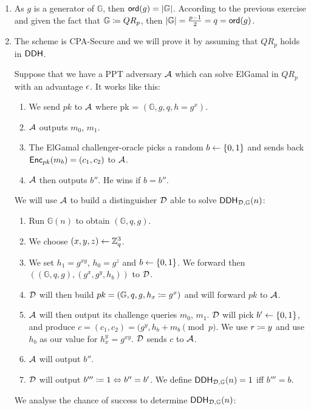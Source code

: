 \begin{solution}
	\begin{enumerate}
		\item As $g$ is a generator of $\mathbb{G}$, then $\operatorname{\mathsf{ord}}(g)=|\mathbb{G}|$.
		According to the previous exercise and given the fact that $\mathbb{G} \coloneqq QR_p$, then $|\mathbb{G}| = \frac{p - 1}{2} = q =  \operatorname{\mathsf{ord}}(g)$.

		\item The scheme is CPA-Secure and we will prove it by assuming that $QR_p$ holds in $\mathsf{DDH}$.

		Suppose that we have a PPT adversary $\mathcal{A}$ which can solve ElGamal in $QR_p$ with an advantage $\epsilon$. It works like this:
		\begin{enumerate}
			\item We send $pk$ to $\mathcal{A}$ where pk = $(\mathbb{G}, g, q, h = g^x)$.
			\item $\mathcal{A}$ outputs $m_0$, $m_1$.
			\item The ElGamal challenger-oracle picks a random $b \leftarrow \{0, 1\}$ and sends back $\operatorname{\mathsf{Enc}}_{pk}(m_b) = (c_1, c_2)$  to $\mathcal{A}$.
			\item $\mathcal{A}$ then outputs $b''$. He wins if $b=b''$.
		\end{enumerate}
		We will use $\mathcal{A}$ to build a distinguisher $\mathcal{D}$ able to solve $\mathsf{DDH}_{\mathcal{D}, \mathbb{G}}(n)$:
		\begin{enumerate}
			\item Run $\mathbb{G}(n)$ to obtain $(\mathbb{G}, q, g)$.
			\item We choose $(x, y, z) \leftarrow \mathbb{Z}^3_q$.
			\item We set $h_1 = g^{xy}$, $h_0 = g^{z}$ and $b \leftarrow \{0, 1\}$.
			We forward then $((\mathbb{G}, q, g), (g^x, g^y, h_{b}))$ to $\mathcal{D}$.
			\item $\mathcal{D}$ will then build $pk  = (\mathbb{G}, q, g, h_x \coloneqq g^x)$ and will forward $pk$ to $\mathcal{A}$.
			\item $\mathcal{A}$ will then output its challenge queries $m_0$, $m_1$.
			$\mathcal{D}$ will pick $b' \leftarrow \{0, 1\}$, and produce $c = (c_1, c_2) = (g^y, h_{b} + m_b \pmod p$.
			We use $r \coloneqq y$ and use $h_b$ as our value for $h_x^y=g^{xy}$.
			$\mathcal{D}$ sends $c$ to $\mathcal{A}$.
			\item $\mathcal{A}$ will output $b''$.
			\item $\mathcal{D}$ will output $ b''' \coloneqq 1 \Leftrightarrow b'' = b'$. We define $\mathsf{DDH}_{\mathcal{D}, \mathbb{G}}(n)=1$ iff $b'''=b$.
		\end{enumerate}
		We analyse the chance of success to determine $\mathsf{DDH}_{\mathcal{D}, \mathbb{G}}(n)$:

\end{enumerate}
\end{solution}
